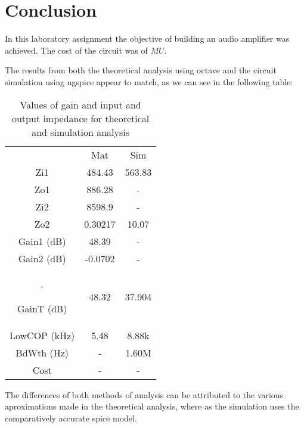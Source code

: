 \section{Conclusion}
\label{sec:conclusion}

In this laboratory assignment the objective of building an audio amplifier was achieved.
 The cost of the circuit was of $ MU$.
 
The results from both the theoretical analysis using octave and the circuit
simulation using ngspice appear to match, as we can see in the following table:

\begin{table}[H]
\addtolength{\tabcolsep}{-4pt}
\caption{Values of gain and input and output impedance for theoretical and simulation analysis}
\vspace{-3mm}
\begin{tabular}{|c|c|c|}
\hline
 &	Mat &	Sim\\

Zi1 &484.43&	563.83\\

Zo1 &886.28	&-\\

Zi2&	8598.9	&-\\

Zo2&	0.30217&	10.07\\

Gain1 (dB)&	48.39	&-\\

Gain2 (dB)&	-0.0702&-\\	-

GainT (dB)&	48.32	&37.904\\

LowCOP (kHz)&	5.48&	8.88k\\

BdWth (Hz)	&-	&1.60M\\

Cost	&-&	-\\
\hline
\end{tabular}
\label{tab:Comparison}
\end{table}


The differences of both methods of analysis can be attributed to the various aproximations
made in the theoretical analysis, where as the simulation uses the comparatively accurate spice model.